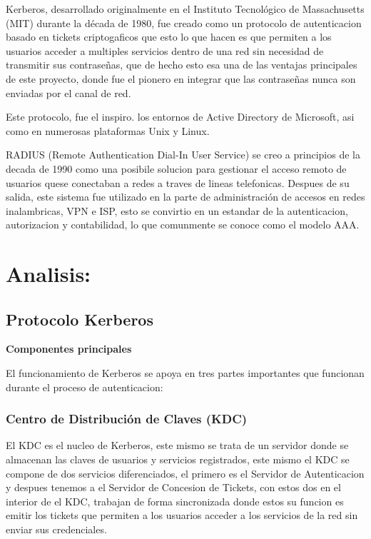 \documentclass[letterpaper,12pt]{article}
\begin{document}
Kerberos, desarrollado originalmente en el Instituto Tecnol\'ogico de Massachusetts (MIT) 
durante la d\'ecada de 1980, fue creado como un protocolo de autenticacion basado en tickets 
criptogaficos que esto lo que hacen es que permiten a los usuarios acceder 
a multiples servicios dentro de una red sin necesidad de transmitir sus contraseñas, que de hecho esto esa una de las ventajas 
principales de este proyecto, donde fue el pionero en integrar que las contraseñas nunca son enviadas por el canal de red. 

Este protocolo, fue el inspiro. los entornos de Active Directory de Microsoft, 
asi como en numerosas plataformas Unix y Linux.

RADIUS (Remote Authentication Dial-In User Service) se creo 
a principios de la decada de 1990 como una posibile solucion para gestionar 
el acceso remoto de usuarios quese conectaban a redes a traves de 
lineas telefonicas. Despues de su salida, este sistema fue utilizado en la parte de administraci\'on
de accesos en redes inalambricas, VPN e ISP, esto se convirtio en un estandar
de la autenticacion, autorizacion y contabilidad, lo que comunmente se conoce como el modelo AAA.

\newpage

\section{Analisis:}

\subsection{Protocolo Kerberos}

\textbf{Componentes principales}

El funcionamiento de Kerberos se apoya en tres partes importantes que funcionan durante el proceso de autenticacion:

\subsubsection{Centro de Distribuci\'on de Claves (KDC)}

El KDC es el nucleo de Kerberos, este mismo se trata de un servidor 
donde se almacenan las claves de usuarios y servicios registrados, este mismo el KDC 
se compone de dos servicios diferenciados, el primero es el Servidor de Autenticacion y despues 
tenemos a el Servidor de Concesion de Tickets, con estos dos en el interior de el KDC,
trabajan de forma sincronizada donde estos su funcion es emitir los tickets 
que permiten a los usuarios acceder a los servicios de la red sin enviar sus credenciales.
\end{document}
